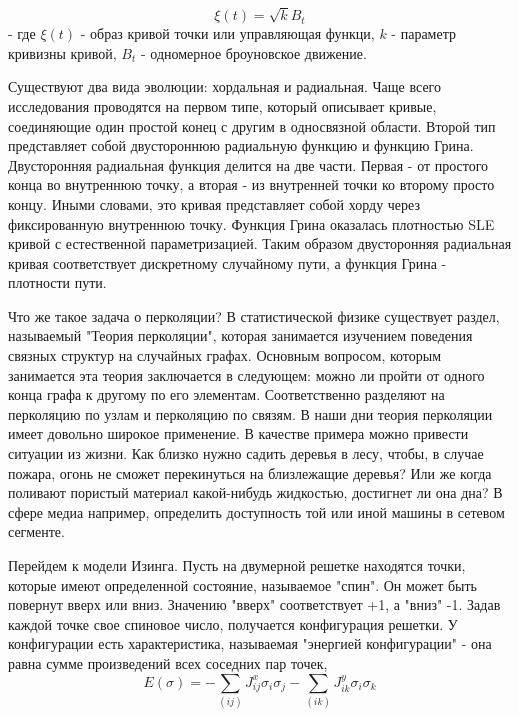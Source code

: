 \documentclass[a4paper]{article}
\begin{document}
	\begin{equation}\label{invar}
		\xi(t) = \sqrt{k}B_{t}
	\end{equation}
	 - где $\xi(t)$ - образ кривой точки или управляющая функци, $k$ - параметр кривизны кривой, $B_{t}$ - одномерное броуновское движение.
	\par Существуют два вида эволюции: хордальная и радиальная. Чаще всего исследования проводятся на первом типе, который описывает кривые, соединяющие один простой конец с другим в односвязной области\cite{chordal}. Второй тип представляет собой двустороннюю радиальную функцию и функцию Грина\cite{radial}. Двусторонняя радиальная функция делится на две части. Первая - от простого конца во внутреннюю точку, а вторая - из внутренней точки ко второму просто концу. Иными словами, это кривая представляет собой хорду через фиксированную внутреннюю точку. Функция Грина оказалась плотностью SLE кривой с естественной параметризацией. Таким образом двусторонняя радиальная кривая соответствует дискретному случайному пути, а функция Грина - плотности пути. 
	
	
	\par Что же такое задача о перколяции? В статистической физике существует раздел, называемый "Теория перколяции", которая занимается изучением поведения связных структур на случайных графах\cite{crit_perc}. Основным вопросом, которым занимается эта теория заключается в следующем: можно ли пройти от одного конца графа к другому по его элементам. Соответственно разделяют на перколяцию по узлам и перколяцию по связям. В наши дни теория перколяции имеет довольно широкое применение. В качестве примера можно привести ситуации из жизни. Как близко нужно садить деревья в лесу, чтобы, в случае пожара, огонь не сможет перекинуться на близлежащие деревья? Или же когда поливают пористый материал какой-нибудь жидкостью, достигнет ли она дна? В сфере медиа например, определить доступность той или иной машины в сетевом сегменте.
	
	\par Перейдем к модели Изинга\cite{conf_inv}. Пусть на двумерной решетке находятся точки, которые имеют определенной состояние, называемое "спин". Он может быть повернут вверх или вниз. Значению "вверх" соответствует +1, а "вниз" -1. Задав каждой точке свое спиновое число, получается конфигурация решетки. У конфигурации есть характеристика, называемая "энергией конфигурации" - она равна сумме произведений всех соседних пар точек,
	\begin{equation}\label{conf_energy}
		E({\sigma}) = - \sum_{(ij)}J_{ij}^{x}\sigma_{i}\sigma_{j} -\sum_{(ik)}J_{ik}^{y}\sigma_{i}\sigma_{k}
	\end{equation}
	
\end{document}
